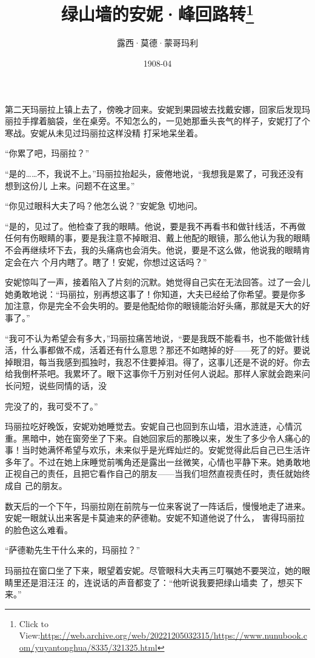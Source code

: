 \documentclass{article}
\title{绿山墙的安妮·峰回路转\footnote{Click to View:\url{https://web.archive.org/web/20221205032315/https://www.nunubook.com/yuyantonghua/8335/321325.html}}}
\author{露西·莫德·蒙哥玛利}
\date{1908-04}
\begin{document}

\maketitle


\Large

﻿第二天玛丽拉上镇上去了，傍晚才回来。安妮到果园坡去找戴安娜，回家后发现玛丽拉手撑着脑袋，坐在桌旁。不知怎么的，一见她那垂头丧气的样子，安妮打了个寒战。安妮从未见过玛丽拉这样没精
打采地呆坐着。 


“你累了吧，玛丽拉？” 

“是的……不，我说不上。”玛丽拉抬起头，疲倦地说，“我想我是累了，可我还没有想到这份儿
上来。问题不在这里。” 

“你见过眼科大夫了吗？他怎么说？”安妮急
切地问。 

\newpage

“是的，见过了。他检查了我的眼睛。他说，要是我不再看书和做针线活，不再做任何有伤眼睛的事，要是我注意不掉眼泪、戴上他配的眼镜，那么他认为我的眼睛不会再继续坏下去，我的头痛病也会消失。他说，要是不这么做，他说我的眼睛肯定会在六
个月内瞎了。瞎了！安妮，你想过这话吗？” 

安妮惊叫了一声，接着陷入了片刻的沉默。她觉得自己实在无法回答。过了一会儿她勇敢地说：“玛丽拉，别再想这事了！你知道，大夫已经给了你希望。要是你多加注意，你是完全不会失明的。要是他配给你的眼镜能治好头痛，那就是天大的好事了。”
 

“我可不认为希望会有多大，”玛丽拉痛苦地说，“要是我既不能看书，也不能做针线活，什么事都做不成，活着还有什么意思？那还不如瞎掉的好——死了的好。要说掉眼泪，每当我感到孤独时，我忍不住要掉泪。得了，这事儿还是不说的好。你去给我倒杯茶吧。我累坏了。眼下这事你千万别对任何人说起。那样人家就会跑来问长问短，说些同情的话，没
\newpage

完没了的，我可受不了。” 

玛丽拉吃好晚饭，安妮劝她睡觉去。安妮自己也回到东山墙，泪水涟涟，心情沉重。黑暗中，她在窗旁坐了下来。自她回家后的那晚以来，发生了多少令人痛心的事！当时她满怀希望与欢乐，未来似乎是光辉灿烂的。安妮觉得此后自己已生活许多年了。不过在她上床睡觉前嘴角还是露出一丝微笑，心情也平静下来。她勇敢地正视自己的责任，且把它看作自己的朋友——当我们坦然直视责任时，责任就始终成自
己的朋友。 

数天后的一个下午，玛丽拉刚在前院与一位来客说了一阵话后，慢慢地走了进来。安妮一眼就认出来客是卡莫迪来的萨德勒。安妮不知道他说了什么，
害得玛丽拉的脸色这么难看。 


“萨德勒先生干什么来的，玛丽拉？” 

玛丽拉在窗口坐了下来，眼望着安妮。尽管眼科大夫再三叮嘱她不要哭泣，她的眼睛里还是泪汪汪
\newpage
的，连说话的声音都变了：“他听说我要把绿山墙卖
了，想买下来。” 
\end{document}
